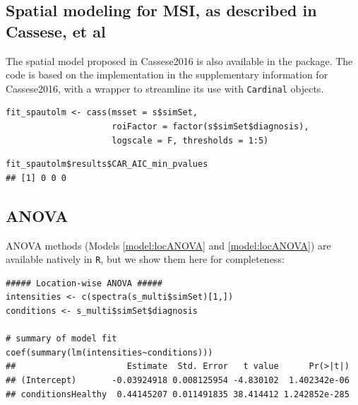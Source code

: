 \documentclass[a4paper]{article}\usepackage[]{graphicx}\usepackage[]{color}
\makeatletter
\newenvironment{kframe}{%
 \def\at@end@of@kframe{}%
 \ifinner\ifhmode%
  \def\at@end@of@kframe{\end{minipage}}%
  \begin{minipage}{\columnwidth}%
 \fi\fi%
 \def\FrameCommand##1{\hskip\@totalleftmargin \hskip-\fboxsep
 \colorbox{shadecolor}{##1}\hskip-\fboxsep
     \hskip-\linewidth \hskip-\@totalleftmargin \hskip\columnwidth}%
 \MakeFramed {\advance\hsize-\width
   \@totalleftmargin\z@ \linewidth\hsize
   \@setminipage}}%
 {\par\unskip\endMakeFramed%
 \at@end@of@kframe}
\newenvironment{knitrout}{}{} %
\makeatother
\begin{document}
\subsection{Spatial modeling for MSI, as described in Cassese, et al}
The spatial model proposed in {Cassese2016} is also available in the package. The code is based on the implementation in the supplementary information for {Cassese2016}, with a wrapper to streamline its use with \texttt{Cardinal} objects.

\begin{knitrout}
\color{fgcolor}\begin{kframe}
\begin{verbatim}
fit_spautolm <- cass(msset = s$simSet, 
                     roiFactor = factor(s$simSet$diagnosis),
                     logscale = F, thresholds = 1:5)
\end{verbatim}
\end{kframe}
\end{knitrout}
\begin{knitrout}
\color{fgcolor}\begin{kframe}
\begin{verbatim}
fit_spautolm$results$CAR_AIC_min_pvalues
## [1] 0 0 0
\end{verbatim}
\end{kframe}
\end{knitrout}


\subsection{ANOVA}
ANOVA methods (Models \ref{model:locANOVA} and \ref{model:locANOVA}) are available natively in \texttt{R}, but we show them here for completeness:
\begin{knitrout}
\color{fgcolor}\begin{kframe}
\begin{verbatim}
##### Location-wise ANOVA #####
intensities <- c(spectra(s_multi$simSet)[1,])
conditions <- s_multi$simSet$diagnosis

# summary of model fit
coef(summary(lm(intensities~conditions))) 
##                      Estimate  Std. Error   t value      Pr(>|t|)
## (Intercept)       -0.03924918 0.008125954 -4.830102  1.402342e-06
## conditionsHealthy  0.44145207 0.011491835 38.414412 1.242852e-285
\end{verbatim}
\end{kframe}
\end{knitrout}
\end{document}
